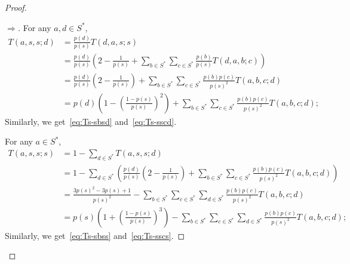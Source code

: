 \documentclass[AHL,Unicode,longabstracts]{cedram}
\newcounter{a}
\begin{document}
\begin{proof}
\begin{proof}[$\Rightarrow$]
For any $a,d \in S^*$,
\begin{align*}
T(a,s,s;d) & = \frac{p(d)}{p(s)} T(d,a,s;s) \\
& = \frac{p(d)}{p(s)} \left(2 - \frac{1}{p(s)} + \sum_{b \in S^*} \sum_{c \in S^*} \frac{p(b)}{p(s)}T(d,a,b;c)\right)\\
& = \frac{p(d)}{p(s)} \left(2 -\frac{1}{p(s)} \right) + \sum_{b \in S^*} \sum_{c \in S^*} \frac{p(b)p(c)}{p(s)^2}T(a,b,c;d)\\
& = p(d) \left(1 - \left(\frac{1-p(s)}{p(s)} \right)^2 \right) + \sum_{b \in S^*} \sum_{c \in S^*} \frac{p(b)p(c)}{p(s)^2}T(a,b,c;d);
\end{align*}
Similarly, we get~\eqref{eq:Ts-sbsd} and~\eqref{eq:Ts-sscd}.

For any $a \in S^*$,
\begin{align*}
T(a,s,s;s) & = 1 - \sum_{d \in S^*} T(a,s,s;d) \\
& = 1 - \sum_{d \in S^*} \left(\frac{p(d)}{p(s)} \left(2 - \frac{1}{p(s)}\right) + \sum_{b \in S^*} \sum_{c \in S^*} \frac{p(b)p(c)}{p(s)^2}T(a,b,c;d) \right)\\
& = \frac{3 p(s)^2 - 3p(s) + 1}{p(s)^2} - \sum_{b \in S^*} \sum_{c \in S^*} \sum_{d \in S^*} \frac{p(b)p(c)}{p(s)^2}T(a,b,c;d)\\
& = p(s) \left(1 + \left(\frac{1-p(s)}{p(s)} \right)^3 \right) - \sum_{b \in S^*} \sum_{c \in S^*} \sum_{d \in S^*} \frac{p(b)p(c)}{p(s)^2}T(a,b,c;d);
\end{align*}
Similarly, we get~\eqref{eq:Ts-sbss} and~\eqref{eq:Ts-sscs}.


\end{proof}
\end{proof}
\end{document}
